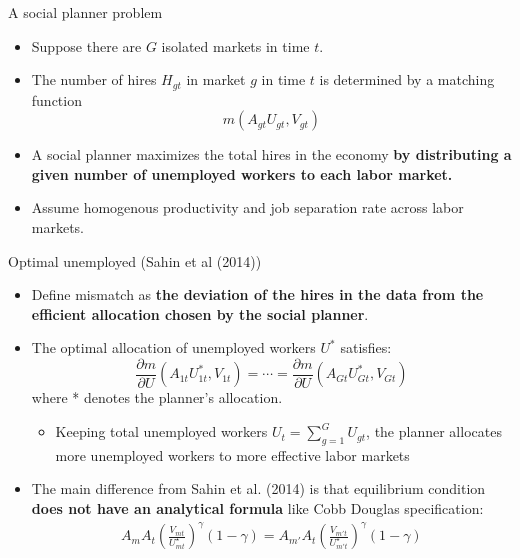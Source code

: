 \documentclass[aspectratio=169]{beamer}
\begin{document}
\begin{frame}{A social planner problem}
    \begin{itemize}
    \item Suppose there are $G$ isolated markets in time $t$. 
    \item The number of hires $H_{g t}$ in market $g$ in time $t$ is determined by a matching function $$m\left(A_{g t} U_{g t}, V_{g t}\right)$$
    \item A social planner maximizes the total hires in the economy \textbf{by distributing a given number of unemployed workers to each labor market.}
    \item Assume homogenous productivity and job separation rate across labor markets.
\end{itemize}
\end{frame}

\begin{frame}{Optimal unemployed (Sahin et al (2014))}
    \begin{itemize}
    \item Define mismatch as \textbf{the deviation of the hires in the data from the efficient allocation chosen by the social planner}. 
    
    \item The optimal allocation of unemployed workers $U^*$ satisfies:
    $$
    \frac{\partial m}{\partial U}\left(A_{1 t} U_{1 t}^*, V_{1 t}\right)=\cdots=\frac{\partial m}{\partial U}\left(A_{G t} U_{G t}^*, V_{G t}\right)
    $$
    where * denotes the planner's allocation.
    \begin{itemize}
        \item Keeping total unemployed workers $U_t=\sum_{g=1}^G U_{g t}$, the planner allocates more unemployed workers to more effective labor markets%
    \end{itemize}
    \item The main difference from Sahin et al. (2014) is that equilibrium condition \textbf{does not have an analytical formula} like Cobb Douglas specification:
    \begin{align*}
        A_{m}A_{t}\left(\frac{V_{m t}}{U_{m t}^{\star}}\right)^\gamma (1-\gamma)=A_{m'}A_{t}\left(\frac{V_{m' t}}{U_{m' t}^{\star}}\right)^\gamma (1-\gamma)
    \end{align*}
\end{itemize}
\end{frame}
\end{document}
